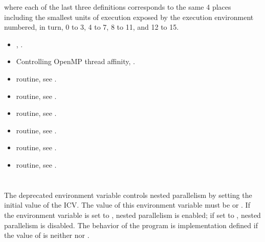 where each of the last three definitions corresponds to the same 4 places including the
smallest units of execution exposed by the execution environment numbered, in turn, 0
to 3, 4 to 7, 8 to 11, and 12 to 15.

\crossreferences
\begin{itemize}
\item {}, .

\item Controlling OpenMP thread affinity, .

\item {} routine, see .

\item {} routine, see .

\item {} routine, see .

\item {} routine, see .

\item {} routine, see .

\item {} routine, see .
\end{itemize}










\section{}
\label{sec:OMP_NESTED}
The deprecated  environment variable controls nested parallelism by setting the
initial value of the  ICV. The value of this environment variable must be 
or . If the environment variable is set to , nested parallelism is enabled; if
set to , nested parallelism is disabled. The behavior of the program is
implementation defined if the value of  is neither  nor .

